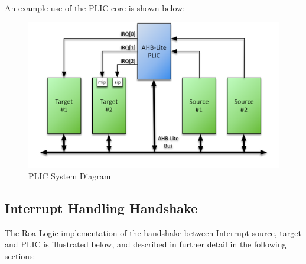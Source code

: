 \documentclass[]{article}
\begin{document}
An example use of the PLIC core is shown below:

\begin{figure}[h]
\centering
\includegraphics{../assets/graphics/AHB-Lite_PLIC_System_Diagram.png}
\caption{PLIC System Diagram}
\end{figure}

\subsection{Interrupt Handling Handshake}

The Roa Logic implementation of the handshake between Interrupt source,
target and PLIC is illustrated below, and described in further detail in
the following sections:
\end{document}
